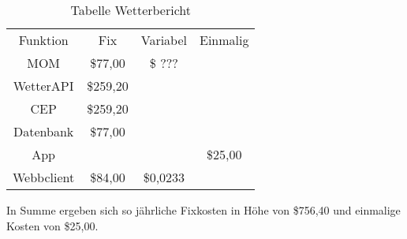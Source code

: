 \begin{table}
\caption{Tabelle Wetterbericht}
\centering
\begin{tabular}{cccc}
	Funktion 	& Fix		& Variabel	& Einmalig \\
	MOM 		& \$77,00	& \$ ??? 	& \\
	WetterAPI 	& \$259,20	&	 		& \\
	CEP 		& \$259,20	& 			& \\
	Datenbank	& \$77,00	&			& \\
	App			&			&			& \$25,00 \\
	Webbclient	& \$84,00	& \$0,0233	& \\
\end{tabular}
\end{table}

In Summe ergeben sich so jährliche Fixkosten in Höhe von \$756,40 und einmalige Kosten von \$25,00.